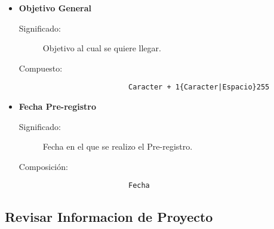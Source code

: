 \begin{itemize}
	\item	\textbf{Objetivo General}
		\begin{description}
			\item[Significado:]Objetivo al cual se quiere llegar.
			\item[Compuesto:]{\begin{lstlisting}
					Caracter + 1{Caracter|Espacio}255\end{lstlisting}}
		\end{description}

	\item	\textbf{Fecha Pre-registro}
		\begin{description}
			\item[Significado:]Fecha en el que se realizo el Pre-registro.
			\item[Composición:]{\begin{lstlisting}
					Fecha\end{lstlisting}}
		\end{description}
\end{itemize}


\subsection{Revisar Informacion de Proyecto}
\label{dd:RevisarInformacionProyecto}

